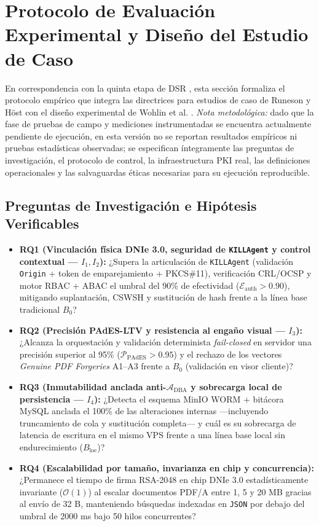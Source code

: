 \documentclass[runningheads,twocolumn]{llncs}
\begin{document}
\section{Protocolo de Evaluación Experimental y Diseño del Estudio de Caso}\label{sec:experiments}

En correspondencia con la quinta etapa de DSR \cite{hevner2004,peffers2007}, esta sección formaliza el protocolo empírico que integra las directrices para estudios de caso de Runeson y H\"ost \cite{runeson2009} con el diseño experimental de Wohlin et al. \cite{wohlin2012}. \emph{Nota metodológica:} dado que la fase de pruebas de campo y mediciones instrumentadas se encuentra actualmente pendiente de ejecución, en esta versión no se reportan resultados empíricos ni pruebas estadísticas observadas; se especifican íntegramente las preguntas de investigación, el protocolo de control, la infraestructura PKI real, las definiciones operacionales y las salvaguardas éticas necesarias para su ejecución reproducible.

\subsection{Preguntas de Investigación e Hipótesis Verificables}
\begin{itemize}
    \item \textbf{RQ1 (Vinculación física DNIe 3.0, seguridad de \texttt{KILLAgent} y control contextual --- $I_1, I_2$):} ¿Supera la articulación de \texttt{KILLAgent} (validación \texttt{Origin} + token de emparejamiento + PKCS\#11), verificación CRL/OCSP y motor RBAC + ABAC el umbral del 90\% de efectividad ($\mathcal{E}_{\text{auth}} > 0.90$), mitigando suplantación, CSWSH y sustitución de hash frente a la línea base tradicional $B_0$?
    \item \textbf{RQ2 (Precisión PAdES-LTV y resistencia al engaño visual --- $I_3$):} ¿Alcanza la orquestación y validación determinista \textit{fail-closed} en servidor una precisión superior al 95\% ($\mathcal{P}_{\text{PAdES}} > 0.95$) y el rechazo de los vectores \textit{Genuine PDF Forgeries} A1--A3 \cite{heher2027} frente a $B_0$ (validación en visor cliente)?
    \item \textbf{RQ3 (Inmutabilidad anclada anti-$\mathcal{A}_{\text{DBA}}$ y sobrecarga local de persistencia --- $I_4$):} ¿Detecta el esquema MinIO WORM + bitácora MySQL anclada el 100\% de las alteraciones internas ---incluyendo truncamiento de cola y sustitución completa--- y cuál es su sobrecarga de latencia de escritura en el mismo VPS frente a una línea base local sin endurecimiento ($B_{\text{loc}}$)?
    \item \textbf{RQ4 (Escalabilidad por tamaño, invarianza en chip y concurrencia):} ¿Permanece el tiempo de firma RSA-2048 en chip DNIe 3.0 estadísticamente invariante ($\mathcal{O}(1)$) al escalar documentos PDF/A entre 1, 5 y 20 MB gracias al envío de 32 B, manteniendo búsquedas indexadas en \texttt{JSON} por debajo del umbral de 2000 ms bajo 50 hilos concurrentes?
\end{itemize}
\end{document}
